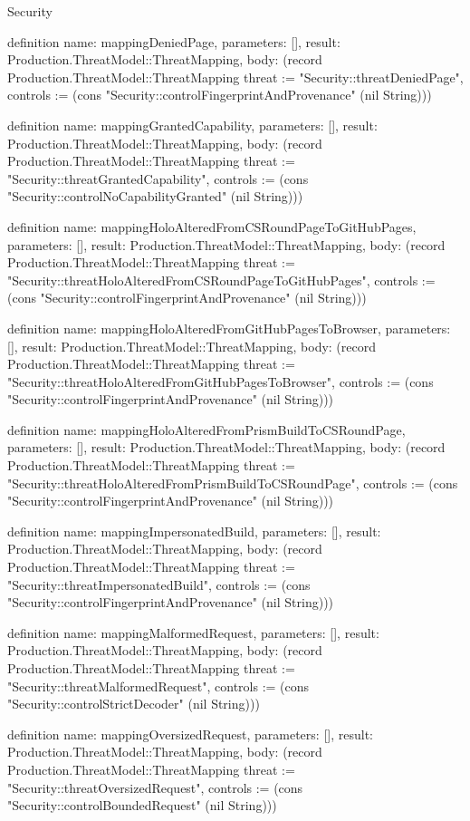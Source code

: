 \begin{lexlean}{Security}
\begin{semanticmodule}
definition{
  name: mappingDeniedPage,
  parameters: [],
  result: Production.ThreatModel::ThreatMapping,
  body: (record Production.ThreatModel::ThreatMapping {threat := "Security::threatDeniedPage", controls := (cons "Security::controlFingerprintAndProvenance" (nil String))})
}

definition{
  name: mappingGrantedCapability,
  parameters: [],
  result: Production.ThreatModel::ThreatMapping,
  body: (record Production.ThreatModel::ThreatMapping {threat := "Security::threatGrantedCapability", controls := (cons "Security::controlNoCapabilityGranted" (nil String))})
}

definition{
  name: mappingHoloAlteredFromCSRoundPageToGitHubPages,
  parameters: [],
  result: Production.ThreatModel::ThreatMapping,
  body: (record Production.ThreatModel::ThreatMapping {threat := "Security::threatHoloAlteredFromCSRoundPageToGitHubPages", controls := (cons "Security::controlFingerprintAndProvenance" (nil String))})
}

definition{
  name: mappingHoloAlteredFromGitHubPagesToBrowser,
  parameters: [],
  result: Production.ThreatModel::ThreatMapping,
  body: (record Production.ThreatModel::ThreatMapping {threat := "Security::threatHoloAlteredFromGitHubPagesToBrowser", controls := (cons "Security::controlFingerprintAndProvenance" (nil String))})
}

definition{
  name: mappingHoloAlteredFromPrismBuildToCSRoundPage,
  parameters: [],
  result: Production.ThreatModel::ThreatMapping,
  body: (record Production.ThreatModel::ThreatMapping {threat := "Security::threatHoloAlteredFromPrismBuildToCSRoundPage", controls := (cons "Security::controlFingerprintAndProvenance" (nil String))})
}

definition{
  name: mappingImpersonatedBuild,
  parameters: [],
  result: Production.ThreatModel::ThreatMapping,
  body: (record Production.ThreatModel::ThreatMapping {threat := "Security::threatImpersonatedBuild", controls := (cons "Security::controlFingerprintAndProvenance" (nil String))})
}

definition{
  name: mappingMalformedRequest,
  parameters: [],
  result: Production.ThreatModel::ThreatMapping,
  body: (record Production.ThreatModel::ThreatMapping {threat := "Security::threatMalformedRequest", controls := (cons "Security::controlStrictDecoder" (nil String))})
}

definition{
  name: mappingOversizedRequest,
  parameters: [],
  result: Production.ThreatModel::ThreatMapping,
  body: (record Production.ThreatModel::ThreatMapping {threat := "Security::threatOversizedRequest", controls := (cons "Security::controlBoundedRequest" (nil String))})
}


\end{semanticmodule}
\end{lexlean}
